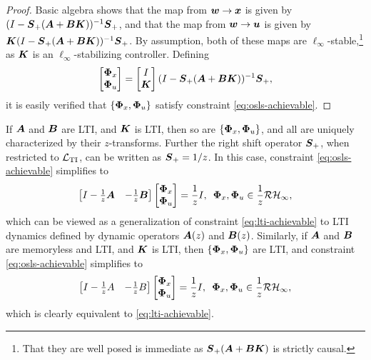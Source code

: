 \begin{proof}
Basic algebra shows that the map from $\boldsymbol{w} \to \boldsymbol{x}$ is given by $(I-\boldsymbol{S}_+(\boldsymbol{A}+\boldsymbol{B}\boldsymbol{K}))^{-1}\boldsymbol{S}_+$, and that the map from $\boldsymbol{w} \to \boldsymbol{u}$ is given by $\boldsymbol{K}(I-\boldsymbol{S}_+(\boldsymbol{A}+\boldsymbol{B}\boldsymbol{K}))^{-1}\boldsymbol{S}_+$.  By assumption, both of these maps are $\ell_\infty$-stable,\footnote{That they are well posed is immediate as $\boldsymbol{S}_+(\boldsymbol{A}+\boldsymbol{B}\boldsymbol{K})$ is strictly causal.} as $\boldsymbol{K}$ is an $\ell_\infty$-stabilizing controller.
Defining
\[
\begin{bmatrix}
\boldsymbol{\Phi}_x \\ \boldsymbol{\Phi}_u
\end{bmatrix} =
\begin{bmatrix} I \\ \boldsymbol{K} \end{bmatrix}(I-\boldsymbol{S}_+(\boldsymbol{A}+\boldsymbol{B}\boldsymbol{K}))^{-1}\boldsymbol{S}_+,
\]
it is easily verified that $\left\{\boldsymbol{\Phi}_x,\boldsymbol{\Phi}_u\right\}$ satisfy constraint \eqref{eq:osls-achievable}.
\end{proof}
\begin{remark}
If $\boldsymbol{A}$ and $\boldsymbol{B}$ are LTI, and $\boldsymbol{K}$ is LTI, then so are $\{\boldsymbol{\Phi}_x,\boldsymbol{\Phi}_u\}$, and all are uniquely characterized by their $z$-transforms.  Further the right shift operator $\boldsymbol{S}_+$, when restricted to $\mathcal{L}_{\mathrm{TI}}$, can be written as $\boldsymbol{S}_+=1/z$.  In this case, constraint \eqref{eq:osls-achievable} simplifies to
\begin{equation}
\begin{bmatrix} I - \frac{1}{z}\boldsymbol{A}& -\frac{1}{z}\boldsymbol{B} \end{bmatrix} \begin{bmatrix} \boldsymbol{\Phi}_x \\ \boldsymbol{\Phi}_u\end{bmatrix} = \frac{1}{z}I, \, \ \boldsymbol{\Phi}_x, \boldsymbol{\Phi}_u \in \frac{1}{z}\mathcal{RH}_\infty,
\end{equation}
which can be viewed as a generalization of constraint \eqref{eq:lti-achievable} to LTI dynamics defined by dynamic operators $\boldsymbol{A}(z)$ and $\boldsymbol{B}(z)$.  Similarly, if $\boldsymbol{A}$ and $\boldsymbol{B}$ are memoryless and LTI, and $\boldsymbol{K}$ is LTI, then $\{\boldsymbol{\Phi}_x,\boldsymbol{\Phi}_u\}$ are LTI, and constraint \eqref{eq:osls-achievable} simplifies to
\begin{equation}
\begin{bmatrix} I - \frac{1}{z}A & -\frac{1}{z}B \end{bmatrix} \begin{bmatrix} \boldsymbol{\Phi}_x \\ \boldsymbol{\Phi}_u \end{bmatrix} = \frac{1}{z}I, \, \ \boldsymbol{\Phi}_x, \boldsymbol{\Phi}_u \in \frac{1}{z}\mathcal{RH}_\infty,
\end{equation}
which is clearly equivalent to \eqref{eq:lti-achievable}.
\end{remark}

